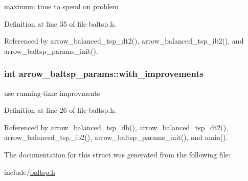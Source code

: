 maximum time to spend on problem 

Definition at line 35 of file baltsp.h.

Referenced by arrow\_\-balanced\_\-tsp\_\-dt2(), arrow\_\-balanced\_\-tsp\_\-ib2(), and arrow\_\-baltsp\_\-params\_\-init().\hypertarget{structarrow__baltsp__params_7147e8fd0ebe031a8d5d36370a206340}{
\subsubsection[{with\_\-improvements}]{\setlength{\rightskip}{0pt plus 5cm}int {\bf arrow\_\-baltsp\_\-params::with\_\-improvements}}}
\label{structarrow__baltsp__params_7147e8fd0ebe031a8d5d36370a206340}


use running-time improvments 

Definition at line 26 of file baltsp.h.

Referenced by arrow\_\-balanced\_\-tsp\_\-db(), arrow\_\-balanced\_\-tsp\_\-dt2(), arrow\_\-balanced\_\-tsp\_\-ib2(), arrow\_\-baltsp\_\-params\_\-init(), and main().

The documentation for this struct was generated from the following file:\begin{CompactItemize}
\item 
include/\hyperlink{baltsp_8h}{baltsp.h}\end{CompactItemize}
